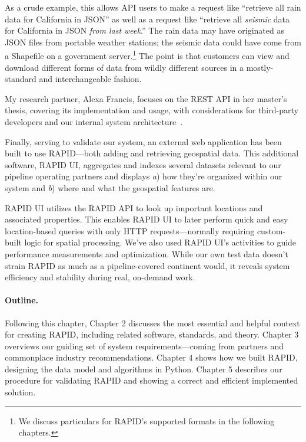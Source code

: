 As a crude example, this allows API users to make a request like ``retrieve all rain data for California in JSON'' as well as a request like ``retrieve all \textit{seismic} data for California in JSON \textit{from last week}.'' The rain data may have originated as JSON files from portable weather stations; the seismic data could have come from a Shapefile on a government server.\footnote{We discuss particulars for RAPID's supported formats in the following chapters.} The point is that customers can view and download different forms of data from wildly different sources in a mostly-standard and interchangeable fashion.

My research partner, Alexa Francis, focuses on the REST API in her master's thesis, covering its implementation and usage, with considerations for third-party developers and our internal system architecture~\cite{Francis}.

\label{polyview_intro}
Finally, serving to validate our system, an external web application has been built to use RAPID---both adding and retrieving geospatial data. This additional software, RAPID UI, aggregates and indexes several datasets relevant to our pipeline operating partners and displays \textit{a}) how they're organized within our system and \textit{b}) where and what the geospatial features are.

RAPID UI utilizes the RAPID API to look up important locations and associated properties. This enables RAPID UI to later perform quick and easy location-based queries with only HTTP requests---normally requiring custom-built logic for spatial processing. We've also used RAPID UI's activities to guide performance measurements and optimization. While our own test data doesn't strain RAPID as much as a pipeline-covered continent would, it reveals system efficiency and stability during real, on-demand work.

\paragraph{Outline.}
Following this chapter, Chapter 2 discusses the most essential and helpful context for creating RAPID, including related software, standards, and theory. Chapter 3 overviews our guiding set of system requirements---coming from partners and commonplace industry recommendations. Chapter 4 shows how we built RAPID, designing the data model and algorithms in Python. Chapter 5 describes our procedure for validating RAPID and showing a correct and efficient implemented solution.


